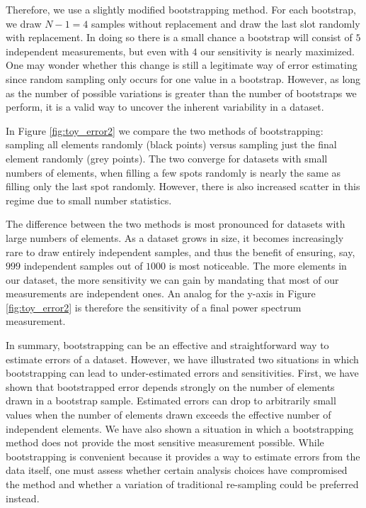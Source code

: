 \documentclass[preprint2,numberedappendix,tighten]{aastex6}  %
\begin{document}
Therefore, we use a slightly modified bootstrapping method. For each bootstrap, we draw $N-1=4$ samples without replacement and draw the last slot randomly with replacement. In doing so there is a small chance a bootstrap will consist of $5$ independent measurements, but even with $4$ our sensitivity is nearly maximized. One may wonder whether this change is still a legitimate way of error estimating since random sampling only occurs for one value in a bootstrap. However, as long as the number of possible variations is greater than the number of bootstraps we perform, it is a valid way to uncover the inherent variability in a dataset. 

In Figure \ref{fig:toy_error2} we compare the two methods of bootstrapping: sampling all elements randomly (black points) versus sampling just the final element randomly (grey points). The two converge for datasets with small numbers of elements, when filling a few spots randomly is nearly the same as filling only the last spot randomly. However, there is also increased scatter in this regime due to small number statistics. 

The difference between the two methods is most pronounced for datasets with large numbers of elements. As a dataset grows in size, it becomes increasingly rare to draw entirely independent samples, and thus the benefit of ensuring, say, $999$ independent samples out of $1000$ is most noticeable. The more elements in our dataset, the more sensitivity we can gain by mandating that most of our measurements are independent ones. An analog for the y-axis in Figure \ref{fig:toy_error2} is therefore the sensitivity of a final power spectrum measurement.

In summary, bootstrapping can be an effective and straightforward way to estimate errors of a dataset. However, we have illustrated two situations in which bootstrapping can lead to under-estimated errors and sensitivities. First, we have shown that bootstrapped error depends strongly on the number of elements drawn in a bootstrap sample. Estimated errors can drop to arbitrarily small values when the number of elements drawn exceeds the effective number of independent elements. We have also shown a situation in which a bootstrapping method does not provide the most sensitive measurement possible. While bootstrapping is convenient because it provides a way to estimate errors from the data itself, one must assess whether certain analysis choices have compromised the method and whether a variation of traditional re-sampling could be preferred instead.
\end{document}
